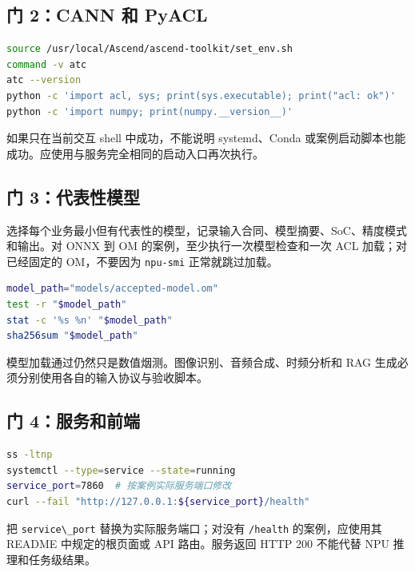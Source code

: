 \subsection{门 2：CANN 和 PyACL}\label{ux95e8-2cann-ux548c-pyacl}

\begin{lstlisting}[language=bash]
source /usr/local/Ascend/ascend-toolkit/set_env.sh
command -v atc
atc --version
python -c 'import acl, sys; print(sys.executable); print("acl: ok")'
python -c 'import numpy; print(numpy.__version__)'
\end{lstlisting}

如果只在当前交互 shell 中成功，不能说明 systemd、Conda
或案例启动脚本也能成功。应使用与服务完全相同的启动入口再次执行。

\subsection{门
3：代表性模型}\label{ux95e8-3ux4ee3ux8868ux6027ux6a21ux578b}

选择每个业务最小但有代表性的模型，记录输入合同、模型摘要、SoC、精度模式和输出。对
ONNX 到 OM 的案例，至少执行一次模型检查和一次 ACL 加载；对已经固定的
OM，不要因为 \passthrough{\lstinline!npu-smi!} 正常就跳过加载。

\begin{lstlisting}[language=bash]
model_path="models/accepted-model.om"
test -r "$model_path"
stat -c '%s %n' "$model_path"
sha256sum "$model_path"
\end{lstlisting}

模型加载通过仍然只是数值烟测。图像识别、音频合成、时频分析和 RAG
生成必须分别使用各自的输入协议与验收脚本。

\subsection{门
4：服务和前端}\label{ux95e8-4ux670dux52a1ux548cux524dux7aef}

\begin{lstlisting}[language=bash]
ss -ltnp
systemctl --type=service --state=running
service_port=7860  # 按案例实际服务端口修改
curl --fail "http://127.0.0.1:${service_port}/health"
\end{lstlisting}

把 \passthrough{\lstinline!service\_port!} 替换为实际服务端口；对没有
\passthrough{\lstinline!/health!} 的案例，应使用其 README
中规定的根页面或 API 路由。服务返回 HTTP 200 不能代替 NPU
推理和任务级结果。

